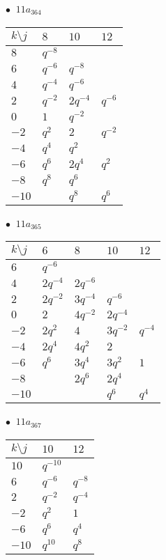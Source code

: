 \begin{minipage}{\linewidth}
$\bullet\ $ $11a_{364}$ \vspace{0.5em} \\
\begin{tabular}{l|lll}
$k \setminus j$ & $8$ & $10$ & $12$ \\
\hline
$8$ & $q^{-8}$ &  &  \\
$6$ & $q^{-6}$ & $q^{-8}$ &  \\
$4$ & $q^{-4}$ & $q^{-6}$ &  \\
$2$ & $q^{-2}$ & $2q^{-4}$ & $q^{-6}$ \\
$0$ & $1$ & $q^{-2}$ &  \\
$-2$ & $q^{2}$ & $2$ & $q^{-2}$ \\
$-4$ & $q^{4}$ & $q^{2}$ &  \\
$-6$ & $q^{6}$ & $2q^{4}$ & $q^{2}$ \\
$-8$ & $q^{8}$ & $q^{6}$ &  \\
$-10$ &  & $q^{8}$ & $q^{6}$ \\
\end{tabular}
\vspace{2em}
\end{minipage}
%
\begin{minipage}{\linewidth}
$\bullet\ $ $11a_{365}$ \vspace{0.5em} \\
\begin{tabular}{l|llll}
$k \setminus j$ & $6$ & $8$ & $10$ & $12$ \\
\hline
$6$ & $q^{-6}$ &  &  &  \\
$4$ & $2q^{-4}$ & $2q^{-6}$ &  &  \\
$2$ & $2q^{-2}$ & $3q^{-4}$ & $q^{-6}$ &  \\
$0$ & $2$ & $4q^{-2}$ & $2q^{-4}$ &  \\
$-2$ & $2q^{2}$ & $4$ & $3q^{-2}$ & $q^{-4}$ \\
$-4$ & $2q^{4}$ & $4q^{2}$ & $2$ &  \\
$-6$ & $q^{6}$ & $3q^{4}$ & $3q^{2}$ & $1$ \\
$-8$ &  & $2q^{6}$ & $2q^{4}$ &  \\
$-10$ &  &  & $q^{6}$ & $q^{4}$ \\
\end{tabular}
\vspace{2em}
\end{minipage}
%
\begin{minipage}{\linewidth}
$\bullet\ $ $11a_{367}$ \vspace{0.5em} \\
\begin{tabular}{l|ll}
$k \setminus j$ & $10$ & $12$ \\
\hline
$10$ & $q^{-10}$ &  \\
$6$ & $q^{-6}$ & $q^{-8}$ \\
$2$ & $q^{-2}$ & $q^{-4}$ \\
$-2$ & $q^{2}$ & $1$ \\
$-6$ & $q^{6}$ & $q^{4}$ \\
$-10$ & $q^{10}$ & $q^{8}$ \\
\end{tabular}
\vspace{2em}
\end{minipage}
